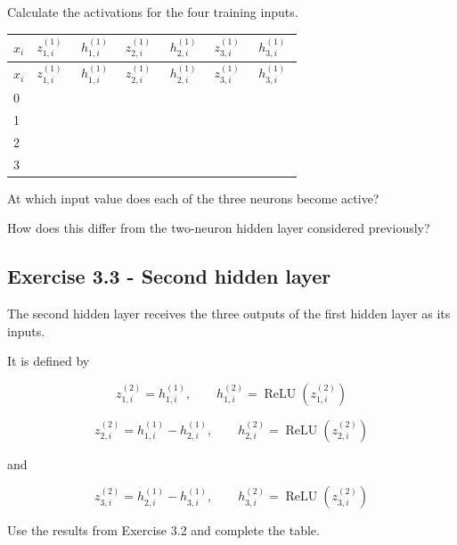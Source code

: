\documentclass{course_sheet}
\begin{document}
Calculate the activations for the four training inputs.

\begingroup
\small
\setlength{\tabcolsep}{4pt}
\begin{longtable}{l|l|l|l|l|l|l}
$x_i$ & $z^{(1)}_{1,i}$ & $h^{(1)}_{1,i}$ & $z^{(1)}_{2,i}$ & $h^{(1)}_{2,i}$ & $z^{(1)}_{3,i}$ & $h^{(1)}_{3,i}$ \\[1.5pt]
\hline
\endfirsthead
$x_i$ & $z^{(1)}_{1,i}$ & $h^{(1)}_{1,i}$ & $z^{(1)}_{2,i}$ & $h^{(1)}_{2,i}$ & $z^{(1)}_{3,i}$ & $h^{(1)}_{3,i}$ \\[1.5pt]
\hline
\endhead
\rule{0pt}{2.4ex}0 &  $\phantom{-0.00}$ &  $\phantom{-0.00}$ &  $\phantom{-0.00}$ &  $\phantom{-0.00}$ &  $\phantom{-0.00}$ &  $\phantom{-0.00}$ \\[3pt]
\rule{0pt}{2.4ex}1 &  $\phantom{-0.00}$ &  $\phantom{-0.00}$ &  $\phantom{-0.00}$ &  $\phantom{-0.00}$ &  $\phantom{-0.00}$ &  $\phantom{-0.00}$ \\[3pt]
\rule{0pt}{2.4ex}2 &  $\phantom{-0.00}$ &  $\phantom{-0.00}$ &  $\phantom{-0.00}$ &  $\phantom{-0.00}$ &  $\phantom{-0.00}$ &  $\phantom{-0.00}$ \\[3pt]
\rule{0pt}{2.4ex}3 &  $\phantom{-0.00}$ &  $\phantom{-0.00}$ &  $\phantom{-0.00}$ &  $\phantom{-0.00}$ &  $\phantom{-0.00}$ &  $\phantom{-0.00}$ \\[3pt]
\end{longtable}
\endgroup
At which input value does each of the three neurons become active?

How does this differ from the two-neuron hidden layer considered previously?

\subsection*{Exercise 3.3 - Second hidden layer}
The second hidden layer receives the three outputs of the first hidden layer as its inputs.

It is defined by

\[
z^{(2)}_{1,i}=h^{(1)}_{1,i},
\qquad
h^{(2)}_{1,i}=\operatorname{ReLU}(z^{(2)}_{1,i})
\]

\[
z^{(2)}_{2,i}=h^{(1)}_{1,i}-h^{(1)}_{2,i},
\qquad
h^{(2)}_{2,i}=\operatorname{ReLU}(z^{(2)}_{2,i})
\]

and

\[
z^{(2)}_{3,i}=h^{(1)}_{2,i}-h^{(1)}_{3,i},
\qquad
h^{(2)}_{3,i}=\operatorname{ReLU}(z^{(2)}_{3,i})
\]

Use the results from Exercise 3.2 and complete the table.
\end{document}
